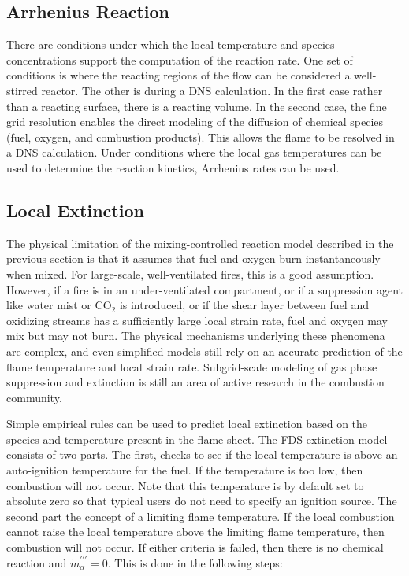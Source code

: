 \subsection{Arrhenius Reaction}
There are conditions under which the local temperature and species concentrations support the computation of the reaction rate.  One set of conditions is where the reacting regions of the flow can be considered a well-stirred reactor.  The other is during a DNS calculation.  In the first case rather than a reacting surface, there is a reacting volume.  In the second case, the fine grid resolution enables the direct modeling of the diffusion of chemical species (fuel,
oxygen, and combustion products).  This allows the flame to be resolved in a DNS calculation.  Under conditions where the local gas
temperatures can be used to determine the reaction kinetics, Arrhenius rates can be used.


\subsection{Local Extinction}

\label{extinction}

The physical limitation of the mixing-controlled reaction model described in the previous section is that it assumes that fuel and oxygen burn instantaneously when mixed. For large-scale, well-ventilated
fires, this is a good assumption. However, if a fire is in an
under-ventilated compartment, or if a suppression agent like water
mist or CO$_2$ is introduced, or if the shear layer between fuel and oxidizing streams
has a sufficiently large local strain rate,
fuel and oxygen may mix but may not burn.
The physical mechanisms underlying these phenomena are complex, and
even simplified models still rely on an accurate prediction
of the flame temperature and local strain rate.
Subgrid-scale modeling of gas phase suppression and
extinction is still an area of active research in the combustion
community.

Simple empirical rules can be used to predict local
extinction based on the species and temperature present in the flame sheet.  The FDS extinction model consists of two parts. The first, checks to see if the local temperature is above an auto-ignition temperature for the fuel.  If the temperature is too low, then combustion will not occur.  Note that this temperature is by default set to absolute zero so that typical users do not need to specify an ignition source.  The second part the concept of a limiting flame temperature.  If the local combustion cannot raise the local temperature above the limiting flame temperature, then combustion will not occur. If either criteria is failed, then there is no chemical reaction and $\dot{m}^{\prime\prime\prime}_{\alpha}=0$. This is done in the following steps:

